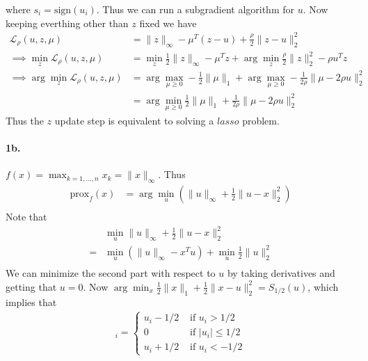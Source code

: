 \documentclass[12pt, leqno]{article}
\providecommand{\abs}[1]{\lvert#1\rvert}
\providecommand{\norm}[1]{\lVert#1\rVert}
\newcommand{\sign}{\mathrm{sign}}
\newcommand{\prox}{\mathrm{prox}}
\begin{document}
where $s_i = \sign(u_i)$. Thus we can run a subgradient algorithm for
$u$. Now keeping everthing other than $z$ fixed we have 
\begin{align*}
  \mathcal{L}_{\rho}(u,z,\mu) &=
\norm{z}_{\infty} - \mu^T(z-u) + \frac{\rho}{2}\norm{z-u}_2^2
  \\
\implies \min_z \mathcal{L}_{\rho}(u,z,\mu) &= \min_z \frac{1}{2}
\norm{z}_{\infty} - \mu^Tz + \arg\min_z 
                                                      \frac{\rho}{2}\norm{z}_2^2
                                                      - {\rho} u^Tz
  \\
\implies \arg\min_z \mathcal{L}_{\rho}(u,z,\mu) &= \arg\max_{\mu
  \geq 0 }-\frac{1}{2}
  \norm{\mu}_1 + \arg\max_{\mu
  \geq 0 }-\frac{1}{2\rho}
  \norm{\mu-2\rho u}_2^2  \\
&= \arg\min_{\mu \geq 0} \frac{1}{2}
  \norm{\mu}_1 + \frac{1}{2\rho}
  \norm{\mu-2\rho u}_2^2
\end{align*}
Thus the $z$ update step is equivalent to solving a $lasso$ problem. 



\paragraph{1b.} $f(x) = \max_{k=1,...,n} x_k = \norm{x}_{\infty}$.
Thus 
\begin{align*}
\prox_{f} (x) &= \arg\min_{u} (\norm{u}_{\infty} +
               \frac{1}{2}\norm{u-x}_2^2) \\
\end{align*}
Note that
\begin{align*}
&\min_{u} \norm{u}_{\infty} +
               \frac{1}{2}\norm{u-x}_2^2\\
=& \min_{u} (\norm{u}_{\infty} - x^Tu) + \min_{u} \frac{1}{2} \norm{u}_2^2\\
\end{align*}
We can minimize the second part with respect to $u$ by taking
derivatives and getting that $u=0$.
Now $\arg\min_x \frac{1}{2} \norm{x}_1 + \frac{1}{2} \norm{x-u}_2^2 =
S_{1/2}(u)$, which implies that 
\begin{align*}
[S_{1/2}(u)]_i = \begin{cases} u_i-1/2 & \text{ if } u_i>1/2 \\
0 & \text{ if } \abs{u_i} \leq 1/2 \\
u_i + 1/2 & \text{ if } u_i<-1/2
\end{cases}
\end{align*}
\end{document}
